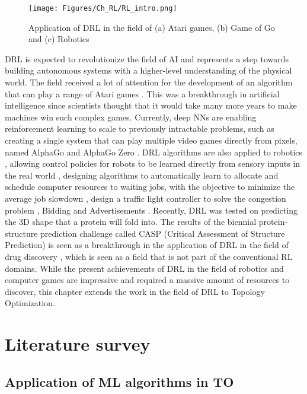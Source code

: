 \begin{figure}[h!]
    \centering
    \texttt{[image: Figures/Ch\_RL/RL\_intro.png]}
    \caption{Application of DRL in the field of (a) Atari games, (b) Game of Go and (c) Robotics}
    \label{fig:RL_intro}
\end{figure}

DRL is expected to revolutionize the field of AI and represents a step towards building autonomous systems with a higher-level understanding of the physical world. The field received a lot of attention for the development of an algorithm that can play a range of Atari games \parencite{silver2016mastering}. This was a breakthrough in artificial intelligence since scientists thought that it would take many more years to make machines win such complex games. Currently, deep NNs are enabling reinforcement learning to scale to previously intractable problems, such as creating a single system that can play multiple video games directly from pixels, named AlphaGo \parencite{silver2016mastering} and AlphaGo Zero \parencite{silver2017mastering}. DRL algorithms are also applied to robotics \parencite{kober2013reinforcement}, allowing control policies for robots to be learned directly from sensory inputs in the real world \parencite{levine2016end}, designing algorithms to automatically learn to allocate and schedule computer resources to waiting jobs, with the objective to minimize the average job slowdown \parencite{mao2016resource}, design a traffic light controller to solve the congestion problem \parencite{arel2010reinforcement}, Bidding and Advertisements \parencite{jin2018real}. Recently, DRL was tested on predicting the 3D shape that a protein will fold into. The results of the biennial protein-structure prediction challenge called CASP (Critical Assessment of Structure Prediction) is seen as a breakthrough in the application of DRL in the field of drug discovery \parencite{senior2020improved}, which is seen as a field that is not part of the conventional RL domains. While the present achievements of DRL in the field of robotics and computer games are impressive and required a massive amount of resources to discover, this chapter extends the work in the field of DRL to Topology Optimization.

\section{Literature survey}

\subsection{Application of ML algorithms in TO}

